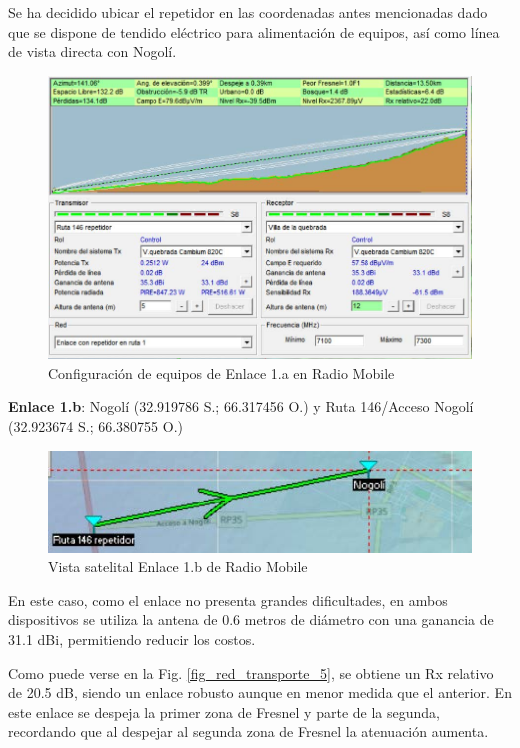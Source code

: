 \documentclass[12pt,a4paper]{book}
\begin{document}
Se ha decidido ubicar el repetidor en las coordenadas antes mencionadas dado que se dispone de tendido eléctrico para alimentación de equipos, así como línea de vista directa con Nogolí.

\begin{figure} [H]
\centering
\includegraphics[width= 12 cm]{../figuras/red_transporte_3.jpg}
\caption{Configuración de equipos de Enlace 1.a en Radio Mobile}
\label{fig_red_transporte_3}
\end{figure}

\noindent\textbf{Enlace 1.b}: Nogolí (32.919786 S.; 66.317456 O.) y Ruta 146/Acceso Nogolí (32.923674 S.; 66.380755 O.)

\begin{figure} [H]
\centering
\includegraphics[width= 12 cm]{../figuras/red_transporte_4.jpg}
\caption{Vista satelital Enlace 1.b de Radio Mobile}
\label{fig_red_transporte_4}
\end{figure}

En este caso, como el enlace no presenta grandes dificultades, en ambos dispositivos se utiliza la antena de 0.6 metros de diámetro con una ganancia de 31.1 dBi, permitiendo reducir los costos.

Como puede verse en la Fig. \ref{fig_red_transporte_5}, se obtiene un Rx relativo de 20.5 dB, siendo un enlace robusto aunque en menor medida que el anterior. En este enlace se despeja la primer zona de Fresnel y parte de la segunda, recordando que al despejar al segunda zona de Fresnel la atenuación aumenta.
\end{document}
